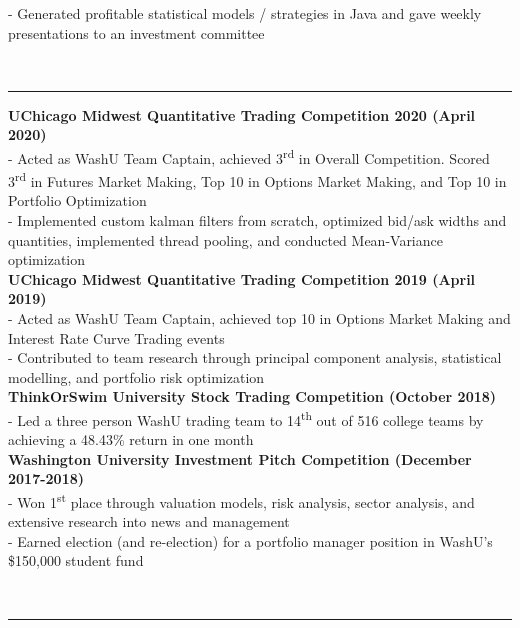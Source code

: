 \documentclass[11pt]{article}
\begin{document}
\begin{titlepage}
\begin{addmargin}[1em]{0em}
				- Generated profitable statistical models / strategies in Java and gave weekly presentations to an investment committee\newline
		\end{addmargin}
		\vspace{-10pt}
		\noindent
		\\\rule{\textwidth}{0.4pt}
		\begin{addmargin}[1em]{0em}
    		\textbf{UChicago Midwest Quantitative Trading Competition 2020 \hfill (April 2020)}\\
				- Acted as WashU Team Captain, achieved 3\textsuperscript{rd} in Overall Competition. Scored 3\textsuperscript{rd} in Futures Market Making, Top 10 in Options Market Making, and Top 10 in Portfolio Optimization\\
				- Implemented custom kalman filters from scratch, optimized bid/ask widths and quantities, implemented thread pooling, and conducted Mean-Variance optimization\\
			\textbf{UChicago Midwest Quantitative Trading Competition 2019 \hfill (April 2019)}\\
				- Acted as WashU Team Captain, achieved top 10 in Options Market Making and Interest Rate Curve Trading events\\
				- Contributed to team research through principal component analysis, statistical modelling, and portfolio risk optimization\\
			\textbf{ThinkOrSwim University Stock Trading Competition \hfill (October 2018)}\\
				- Led a three person WashU trading team to 14\textsuperscript{th} out of 516 college teams by achieving a 48.43\% return in one month\\
           \textbf{Washington University Investment Pitch Competition \hfill (December 2017-2018)}\\
				- Won 1\textsuperscript{st} place through valuation models, risk analysis, sector analysis, and extensive research into news and management\\
				- Earned election (and re-election) for a portfolio manager position in WashU's \$150,000 student fund\\
		\end{addmargin}
		\vspace{-10pt}
		\noindent
		\\\rule{\textwidth}{0.4pt}

\end{titlepage}
\end{document}
